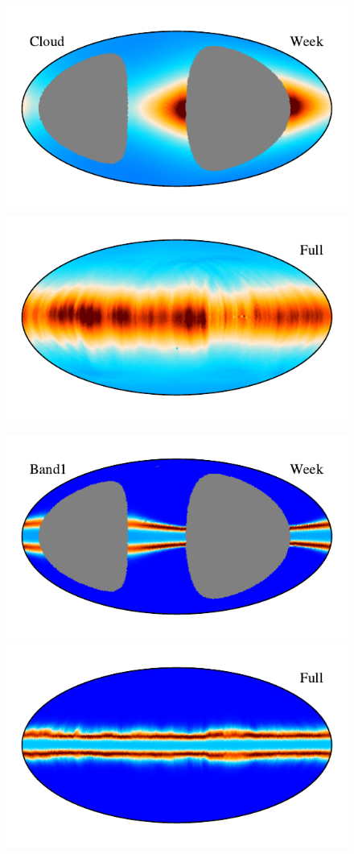 \documentclass{aa}
\begin{document}
  \begin{figure}
    \centering
    \includegraphics[width=0.88\columnwidth]{figs/zodi_comps/zodi_06_cloud_week.pdf}\includegraphics[width=0.88\columnwidth]{figs/zodi_comps/zodi_06_cloud_full.pdf}

    \vspace{-0.6cm}

    \includegraphics[width=0.88\columnwidth]{figs/zodi_comps/zodi_06_band1_week.pdf}\includegraphics[width=0.88\columnwidth]{figs/zodi_comps/zodi_06_band1_full.pdf}


\end{figure}
\end{document}
